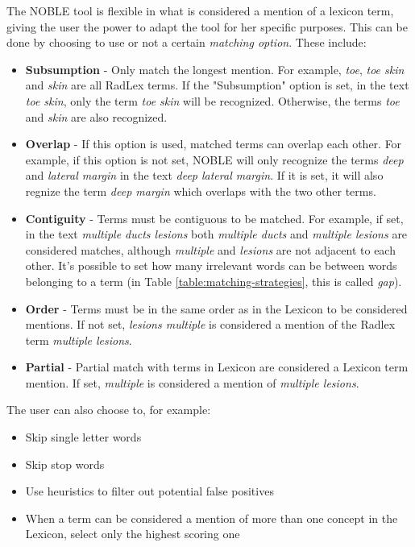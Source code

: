 The NOBLE tool is flexible in what is considered a mention of a lexicon term, giving the user the power to adapt the tool for her specific purposes. This can be done by choosing to use or not a certain \textit{matching option}. These include:

\begin{itemize}

\item \textbf{Subsumption} - Only match the longest mention. For example, \textit{toe}, \textit{toe skin} and \textit{skin} are all RadLex terms. If the "Subsumption" option is set, in the text \textit{toe skin}, only the term \textit{toe skin} will be recognized. Otherwise, the terms \textit{toe} and \textit{skin} are also recognized.

\item \textbf{Overlap} - If this option is used, matched terms can overlap each other. For example, if this option is not set, NOBLE will only recognize the terms \textit{deep} and \textit{lateral margin} in the text \textit{deep lateral margin}. If it is set, it will also regnize the term \textit{deep margin} which overlaps with the two other terms.

\item \textbf{Contiguity} - Terms must be contiguous to be matched. For example, if set, in the text \textit{multiple ducts lesions} both \textit{multiple ducts} and \textit{multiple lesions} are considered matches, although \textit{multiple} and \textit{lesions} are not adjacent to each other. It's possible to set how many irrelevant words can be between words belonging to a term (in Table \ref{table:matching-strategies}, this is called \textit{gap}).

\item \textbf{Order} - Terms must be in the same order as in the Lexicon to be considered mentions. If not set, \textit{lesions multiple} is considered a mention of the Radlex term \textit{multiple lesions}.

\item \textbf{Partial} - Partial match with terms in Lexicon are considered a Lexicon term mention. If set, \textit{multiple} is considered a mention of \textit{multiple lesions}.

\end{itemize}

The user can also choose to, for example:

\begin{itemize}
\item Skip single letter words
\item Skip stop words
\item Use heuristics to filter out potential false positives
\item When a term can be considered a mention of more than one concept in the Lexicon,  select only the highest scoring one
\end{itemize}

